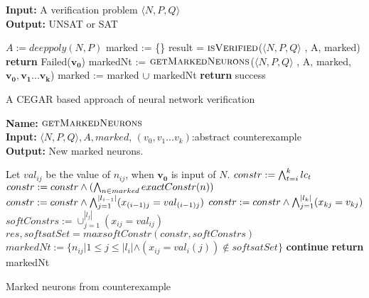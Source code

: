 




\begin{algorithm}[t]
  \textbf{Input: } A verification problem $\langle N,P,Q \rangle$ \\
  \textbf{Output: } UNSAT or SAT
  \begin{algorithmic}[1]
    \State $A := deeppoly(N,P)$
    \State marked := \{\}
      \State result = $\textsc{isVerified}$($\langle N,P,Q \rangle$ , A, marked)
          \State \textbf{return} Failed($\boldsymbol{v_0}$)
        \Else
        \State markedNt := $\textsc{getMarkedNeurons}$($\langle N,P,Q \rangle$ , A, marked, $\boldsymbol{v_0}, \boldsymbol{v_1} ... \boldsymbol{v_k}$)
          \State marked := marked ${\cup}$ markedNt
        \EndIf
      \Else
        \State \textbf{return} success 
      \EndIf
    \EndWhile
  \end{algorithmic}
  \caption{A CEGAR based approach of neural network verification}
  \label{algo:main}
\end{algorithm}

\begin{algorithm}[t]
  \textbf{Name: } $\textsc{getMarkedNeurons}$ \\
  \textbf{Input: } $\langle N,P,Q \rangle,A,marked$, $({v_0}, {v_1} ... {v_k})$:abstract counterexample\\
  \textbf{Output: } New marked neurons. 
  \begin{algorithmic}[1]
    \State Let ${val_{ij}}$ be the value of $n_{ij}$, when $\boldsymbol{v_0}$ is input of $N$. 
     
        \State $constr := \bigwedge_{t=i}^k lc_t$
        \State $constr := constr \land (\bigwedge_{n \in marked} exactConstr(n))$ 
        \State $constr := constr \land \bigwedge_{j=1}^{|l_{i-1}|} (x_{(i-1)j} = val_{(i-1)j})$
        \State $constr := constr \land \bigwedge_{j=1}^{|l_k|} (x_{kj} = v_{kj})$
        \State $softConstrs := \cup_{j=1}^{|l_j|} (x_{ij} = val_{ij})$
        \State $res, softsatSet = maxsoftConstr(constr, softConstrs)$ 
        \State $markedNt := \{n_{ij} | 1 \leq j \leq |l_i| \land (x_{ij} = val_i(j)) \notin  softsatSet\}$ 
          \State \textbf{continue}
        \Else
          \State \textbf{return} markedNt
        \EndIf 
      \EndIf
    \EndFor
  \end{algorithmic}
  \caption{Marked neurons from counterexample}
  \label{algo:refine2}
\end{algorithm}

